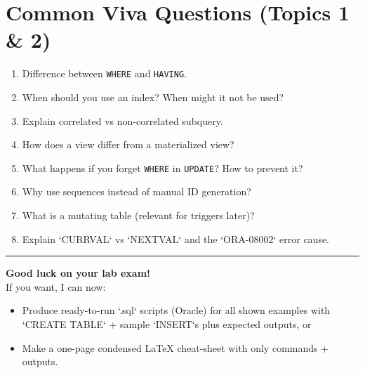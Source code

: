 \documentclass[11pt,a4paper]{article}
\begin{document}
	\section{Common Viva Questions (Topics 1 \& 2)}
	\begin{enumerate}[noitemsep]
		\item Difference between \texttt{WHERE} and \texttt{HAVING}.  
		\item When should you use an index? When might it not be used?  
		\item Explain correlated vs non-correlated subquery.  
		\item How does a view differ from a materialized view?  
		\item What happens if you forget \texttt{WHERE} in \texttt{UPDATE}? How to prevent it?  
		\item Why use sequences instead of manual ID generation?  
		\item What is a mutating table (relevant for triggers later)?  
		\item Explain `CURRVAL` vs `NEXTVAL` and the `ORA-08002` error cause.
	\end{enumerate}
	
	\vfill
	\hrule
	\smallskip
	\noindent \textbf{Good luck on your lab exam!} \\[4pt]
	If you want, I can now:
	\begin{itemize}
		\item Produce ready-to-run `.sql` scripts (Oracle) for all shown examples with `CREATE TABLE` + sample `INSERT`s plus expected outputs, or
		\item Make a one-page condensed LaTeX cheat-sheet with only commands + outputs.
	\end{itemize}
	
\end{document}
